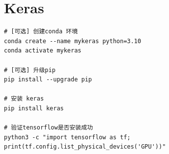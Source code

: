 \chapter{Keras}

\begin{lstlisting}[style=demostyle,numbers=none]
# [可选] 创建conda 环境    
conda create --name mykeras python=3.10
conda activate mykeras

# [可选] 升级pip
pip install --upgrade pip

# 安装 keras 
pip install keras

# 验证tensorflow是否安装成功
python3 -c "import tensorflow as tf; print(tf.config.list_physical_devices('GPU'))"
\end{lstlisting}
